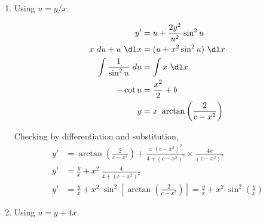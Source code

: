 \begin{enumerate}
    \item Using $u = y/x$.

          \begin{align}
              y'                            & = u + \frac{2 y^{2}}{u^{2}} \sin^{2} u \\
              x\ du + u\ \dl x              & = (u + x^{2} \sin ^{2} u )\ \dl x      \\
              \int \frac{1}{\sin ^{2}u}\ du & = \int x\ \dl x                        \\
              - \cot u                      & = \frac{x^{2}}{2} + b                  \\
              y                             & = x\ \arctan \left(\frac{2}{c - x^{2}}
              \right)
          \end{align}
          \begin{figure}[H]
              \centering
          \end{figure}
          Checking by differentiation and substitution,
          \begin{align}
              y' & = \arctan \left(\frac{2}{c - x^{2}}\right) +
              \frac{x\ (c - x^{2})^{2}}{4 + (c - x^{2})^{2}}
              \times \frac{4x}{(c - x^{2})^{2}}                         \\
              y' & = \frac{y}{x} + x^{2}\ \frac{4}{4 + (c - x^{2})^{2}} \\
              y' & = \frac{y}{x} + x^{2} \ \sin ^{2}
              \left[\arctan\left(\frac{2}{c - x^{2}}\right)\right] = \frac{y}{x}
              + x^{2}\ \sin ^{2} \left(\frac{y}{x}\right)
          \end{align}


    \item Using $u = y + 4x$.


\end{enumerate}
